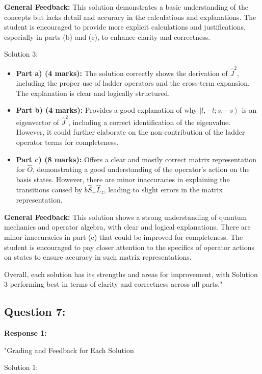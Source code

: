 \documentclass[a4paper,11pt]{article}
\begin{document}
\textbf{General Feedback:} This solution demonstrates a basic understanding of the concepts but lacks detail and accuracy in the calculations and explanations. The student is encouraged to provide more explicit calculations and justifications, especially in parts (b) and (c), to enhance clarity and correctness.

Solution 3:

\begin{itemize}
    \item \textbf{Part a) (4 marks):} The solution correctly shows the derivation of \( \hat{J}^2 \), including the proper use of ladder operators and the cross-term expansion. The explanation is clear and logically structured.
    \item \textbf{Part b) (4 marks):} Provides a good explanation of why \( \left|l, -l; s, -s \right> \) is an eigenvector of \( \hat{J}^2 \), including a correct identification of the eigenvalue. However, it could further elaborate on the non-contribution of the ladder operator terms for completeness.
    \item \textbf{Part c) (8 marks):} Offers a clear and mostly correct matrix representation for \( \hat{O} \), demonstrating a good understanding of the operator's action on the basis states. However, there are minor inaccuracies in explaining the transitions caused by \( b\hat{S}_{+}\hat{L}_{z} \), leading to slight errors in the matrix representation.
\end{itemize}

\textbf{General Feedback:} This solution shows a strong understanding of quantum mechanics and operator algebra, with clear and logical explanations. There are minor inaccuracies in part (c) that could be improved for completeness. The student is encouraged to pay closer attention to the specifics of operator actions on states to ensure accuracy in such matrix representations.

Overall, each solution has its strengths and areas for improvement, with Solution 3 performing best in terms of clarity and correctness across all parts."

\subsection*{Question 7:}

\textbf{Response 1:}

"Grading and Feedback for Each Solution

Solution 1:
\end{document}
